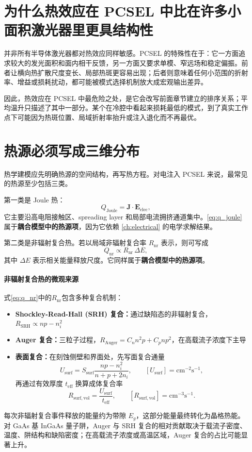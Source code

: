 \section{为什么热效应在 PCSEL 中比在许多小面积激光器里更具结构性}
并非所有半导体激光器都对热效应同样敏感。PCSEL 的特殊性在于：它一方面追求较大的发光面积和面内相干反馈，另一方面又要求单模、窄远场和稳定偏振。前者让横向热扩散尺度变长、局部热斑更容易出现；后者则意味着任何小范围的折射率、增益或损耗扰动，都可能被模式选择机制放大成宏观输出差异。

因此，热效应在 PCSEL 中最危险之处，是它会改写前面章节建立的排序关系；平均温升只描述了其中一部分。某个在冷腔中看起来损耗最低的模式，到了真实工作点下可能因为热斑位置、局域折射率抬升或注入退化而不再最优。

\section{热源必须写成三维分布}
热学建模应先明确热源的空间结构，再写热方程。对电注入 PCSEL 来说，最常见的热源至少包括三类。

第一类是 Joule 热：
\begin{equation}
Q_{\mathrm{Joule}} = \bm{J}\cdot\bm{E}_{\mathrm{elec}},
\label{eq:q_joule}
\end{equation}
它主要沿高电阻接触区、spreading layer 和局部电流拥挤通道集中。\cref{eq:q_joule} 属于\textbf{耦合模型中的热源项}，因为它依赖 \cref{ch:electrical} 的电学求解结果。

第二类是非辐射复合热。若以局域非辐射复合率 $R_{\mathrm{nr}}$ 表示，则可写成
\begin{equation}
Q_{\mathrm{nr}} \propto R_{\mathrm{nr}}\,\Delta E,
\label{eq:q_nr}
\end{equation}
其中 $\Delta E$ 表示相关能量释放尺度。它同样属于\textbf{耦合模型中的热源项}。

\paragraph{非辐射复合热的微观来源}式\cref{eq:q_nr}中的$R_{\mathrm{nr}}$包含多种复合机制：
\begin{itemize}
  \item \textbf{Shockley-Read-Hall (SRH) 复合：}通过缺陷态的非辐射复合，$R_{\mathrm{SRH}} \propto np - n_i^2$
  \item \textbf{Auger 复合：}三粒子过程，$R_{\mathrm{Auger}} = C_n n^2 p + C_p n p^2$，在高载流子浓度下主导
  \item \textbf{表面复合：}在刻蚀侧壁和界面处，先写面复合通量
  \[
  U_{\mathrm{surf}} = S_{\mathrm{surf}}\frac{np-n_i^2}{n+p+2n_i},
  \qquad
  [U_{\mathrm{surf}}]=\mathrm{cm}^{-2}\mathrm{s}^{-1},
  \]
  再通过有效厚度 $t_{\mathrm{eff}}$ 换算成体复合率
  \[
  R_{\mathrm{surf,vol}}=\frac{U_{\mathrm{surf}}}{t_{\mathrm{eff}}},
  \qquad
  [R_{\mathrm{surf,vol}}]=\mathrm{cm}^{-3}\mathrm{s}^{-1}.
  \]
\end{itemize}
每次非辐射复合事件释放的能量约为带隙 $E_g$，这部分能量最终转化为晶格热能。对 GaAs 基 InGaAs 量子阱，Auger 与 SRH 复合的相对贡献取决于载流子密度、温度、阱结构和缺陷密度；在高载流子浓度或高温区域，Auger 复合的占比可能显著上升。

